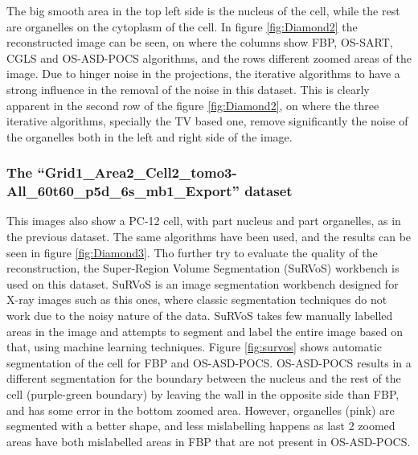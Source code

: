  The big smooth area in the top left side is the nucleus of the cell, while the rest are organelles on the cytoplasm of the cell.  In figure \ref{fig:Diamond2} the reconstructed image can be seen, on where the columns show FBP, OS-SART, CGLS and OS-ASD-POCS algorithms, and the rows different zoomed areas of the image. Due to hinger noise in the projections, the iterative algorithms to have a strong influence in the removal of the noise in this dataset. This is clearly apparent in the second row of the figure \ref{fig:Diamond2}, on where the three iterative algorithms, specially the TV based one, remove significantly the noise of the organelles both in the left and right side of the image. 

\subsubsection{The ``Grid1\_Area2\_Cell2\_tomo3-All\_60t60\_p5d\_6s\_mb1\_Export'' dataset}
This images also show a PC-12 cell, with part nucleus and part organelles, as in the previous dataset. The same algorithms have been used, and the results can be seen in figure \ref{fig:Diamond3}. Tho further try to evaluate the quality of the reconstruction, the Super-Region Volume Segmentation (SuRVoS)\cite{LUENGO201743} workbench is used on this dataset. SuRVoS is an image segmentation workbench designed for X-ray images such as this ones, where classic segmentation techniques do not work due to the noisy nature of the data. SuRVoS takes few manually labelled areas in the image and attempts to segment and label the entire image based on that, using machine learning techniques. Figure \ref{fig:survos} shows automatic segmentation of the cell for FBP and OS-ASD-POCS. OS-ASD-POCS results in a different segmentation for the boundary between the nucleus and the rest of the cell (purple-green boundary) by leaving the wall in the opposite side than FBP, and has some error in the bottom zoomed area. However, organelles (pink) are segmented with a better shape, and less mislabelling happens as last 2 zoomed areas have both mislabelled areas in FBP that are not present in OS-ASD-POCS.



